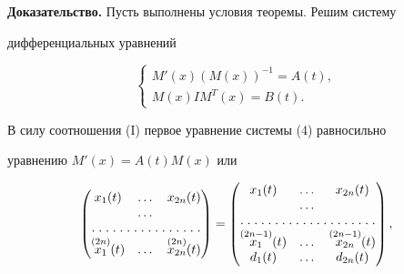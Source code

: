 {\bf Доказательство.} Пусть выполнены условия теоремы. Решим систему 


дифференциальных уравнений


\begin{equation}


\begin{cases}


M'(x)(M(x))^{-1}=A(t), \\


M(x)I M^T(x)=B(t).


\end{cases}


\end{equation}





В силу соотношения (I) первое уравнение системы (4) равносильно


уравнению $M'(x)=A(t)M(x)$ или


\begin{equation}


\begin{pmatrix}


x_1(t) & \dotsc & x_{2n}(t) \\


\ & \dotsc & \ \\


\hdotsfor[1.5]{3}\\


\up{(2n)}{x_1}(t) & \dotsc & \up{(2n)}{x_{2n}}(t)


\end{pmatrix}


=


\begin{pmatrix}


x_1(t) & \dotsc & x_{2n}(t) \\


\ & \dotsc & \ \\


\hdotsfor[1.5]{3}\\


\up{(2n-1)}{x_1}(t) & \dotsc & \up{(2n-1)}{x_{2n}}(t) \\


d_1(t) & \dotsc & d_{2n}(t)


\end{pmatrix}


,


\end{equation}


